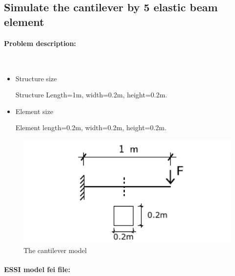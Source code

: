 
\newpage
\subsection{Simulate the cantilever by 5 elastic beam element} 
\paragraph{Problem description:} ~

\begin{itemize}
  \item Structure size

    Structure Length=1m, width=0.2m, height=0.2m.

  \item Element size

    Element length=0.2m, width=0.2m, height=0.2m.
\end{itemize}

\begin{figure}[!htb]
  \centering
  \includegraphics[width=12cm]{./Figure-files/_Chapter_Appendix_Illustrative_Examples/cantilever.pdf}
  \caption{The cantilever model}
  \label{fig_cantilever_m5}
\end{figure}


\paragraph{ESSI model fei file: } ~

